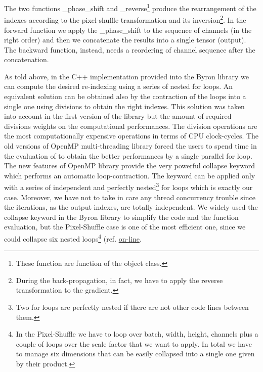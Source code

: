 \documentclass{standalone}
\begin{document}
The two functions \textsf{\_phase\_shift} and \textsf{\_reverse}\footnote{
  These function are  function of the object class.
}
produce the rearrangement of the indexes according to the pixel-shuffle transformation and its inversion\footnote{
  During the back-propagation, in fact, we have to apply the reverse transformation to the gradient.
}.
In the forward function we apply the \textsf{\_phase\_shift} to the sequence of channels (in the right order) and then we concatenate the results into a single tensor (output).
The backward function, instead, needs a reordering of channel sequence after the concatenation.

As told above, in the \textsf{C++} implementation provided into the \textsf{Byron} library we can compute the desired re-indexing using a series of nested for loops.
An equivalent solution can be obtained also by the contraction of the loops into a single one using divisions to obtain the right indexes.
This solution was taken into account in the first version of the library but the amount of required divisions weights on the computational performances.
The division operations are the most computationally expensive operations in terms of CPU clock-cycles.
The old versions of OpenMP multi-threading library forced the users to spend time in the evaluation of  to obtain the better performances by a single parallel for loop.
The new features of OpenMP library provide the very powerful \textsf{collapse} keyword which performs an automatic loop-contraction.
The keyword can be applied only with a series of independent and perfectly nested\footnote{
  Two for loops are perfectly nested if there are not other code lines between them.
}
for loops which is exactly our case.
Moreover, we have not to take in care any thread concurrency trouble since the iterations, as the output indexes, are totally independent.
We widely used the \textsf{collapse} keyword in the \textsf{Byron} library to simplify the code and the function evaluation, but the Pixel-Shuffle case is one of the most efficient one, since we could collapse six nested loops\footnote{
  In the Pixel-Shuffle we have to loop over batch, width, height, channels plus a couple of loops over the scale factor that we want to apply.
  In total we have to manage six dimensions that can be easily collapsed into a single one given by their product.
} (ref. \href{https://github.com/Nico-Curti/Byron/blob/master/src/shuffler_layer.cpp}{on-line}.
\end{document}
